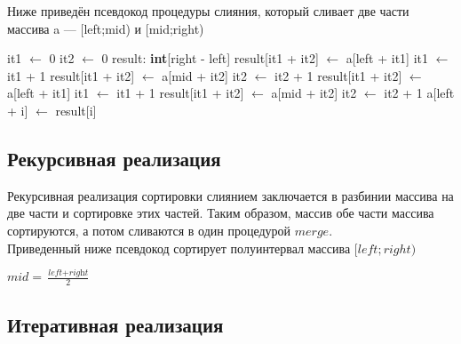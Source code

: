 Ниже приведён псевдокод процедуры слияния, который сливает две части массива a
— [left;mid)
и [mid;right)

\begin{algorithmic}[1]
        \State it1 $\gets$ 0
        \State it2 $\gets$ 0
        \State result: \textbf{int}[right - left]
                \State result[it1 + it2] $\gets$ a[left + it1]
                \State it1 $\gets$ it1 + 1
            \Else
                \State result[it1 + it2] $\gets$ a[mid + it2]
                \State it2 $\gets$ it2 + 1
            \EndIf
        \EndWhile
            \State result[it1 + it2] $\gets$ a[left + it1]
            \State it1 $\gets$ it1 + 1
        \EndWhile
            \State result[it1 + it2] $\gets$ a[mid + it2]
            \State it2 $\gets$ it2 + 1
        \EndWhile
            \State a[left + i] $\gets$ result[i]
        \EndFor
    \EndFunction
\end{algorithmic}

\subsection{Рекурсивная реализация}
Рекурсивная реализация сортировки слиянием заключается в разбинии массива на две части и сортировке этих частей.
Таким образом, массив обе части массива сортируются, а потом сливаются в один процедурой $merge$.\\
Приведенный ниже псевдокод сортирует полуинтервал массива $[left; right)$
\\
\begin{algorithmic}[1]
            \State \Return
        \EndIf
        \State $\textit{mid} = \frac{\textit{left} + \textit{right}}{2}$
        \State {}
        \State {}
        \State {}
    \EndFunction
\end{algorithmic}


\subsection{Итеративная реализация}


